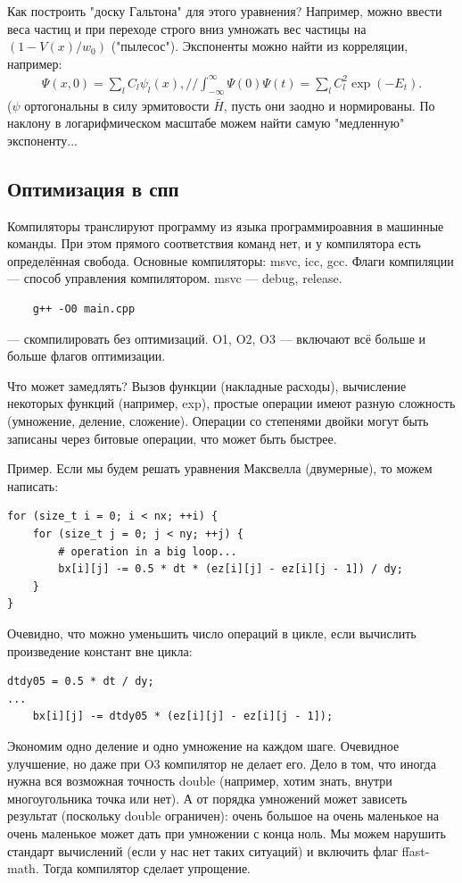 \documentclass{book}
\begin{document}
Как построить "доску Гальтона" для этого уравнения? Например, можно ввести веса частиц и при
переходе строго вниз умножать вес частицы на $(1 - V(x) / w_0)$ ("пылесос"). Экспоненты можно найти
из корреляции, например:
\begin{eqnarray}
    \Psi(x, 0) = \sum_l C_l \psi_l(x), //
    \int_{-\infty}^\infty \Psi(0) \Psi(t) = \sum_l C_l^2 \exp(-E_t).
\end{eqnarray}
($\psi$ ортогональны в силу эрмитовости $\bar H$, пусть они заодно и нормированы. По наклону в
логарифмическом масштабе можем найти самую "медленную" экспоненту...

\subsection{Оптимизация в спп}

Компиляторы транслируют программу из языка программироавния в машинные команды. При этом прямого
соответствия команд нет, и у компилятора есть определённая свобода. Основные компиляторы: msvc,
icc, gcc. Флаги компиляции --- способ управления компилятором. msvc --- debug, release.
\begin{verbatim}
    g++ -O0 main.cpp
\end{verbatim}
--- скомпилировать без оптимизаций. O1, O2, O3 --- включают всё больше и больше флагов оптимизации.

Что может замедлять? Вызов функции (накладные расходы), вычисление некоторых функций (например,
exp), простые операции имеют разную сложность (умножение, деление, сложение). Операции со степенями
двойки могут быть записаны через битовые операции, что может быть быстрее.

Пример. Если мы будем решать уравнения Максвелла (двумерные), то можем написать:
\begin{verbatim}
for (size_t i = 0; i < nx; ++i) {
    for (size_t j = 0; j < ny; ++j) {
        # operation in a big loop...
        bx[i][j] -= 0.5 * dt * (ez[i][j] - ez[i][j - 1]) / dy;
    }
}
\end{verbatim}
Очевидно, что можно уменьшить число операций в цикле, если вычислить произведение констант вне
цикла:
\begin{verbatim}
dtdy05 = 0.5 * dt / dy;
...
    bx[i][j] -= dtdy05 * (ez[i][j] - ez[i][j - 1]);
\end{verbatim}
Экономим одно деление и одно умножение на каждом шаге. Очевидное улучшение, но даже при O3
компилятор не делает его. Дело в том, что иногда нужна вся возможная точность double (например,
хотим знать, внутри многоугольника точка или нет). А от порядка умножений может зависеть результат
(поскольку double ограничен): очень большое на очень маленькое на очень маленькое может дать при
умножении с конца ноль. Мы можем нарушить стандарт вычислений (если у нас нет таких ситуаций) и
включить флаг ffast-math. Тогда компилятор сделает упрощение.
\end{document}
